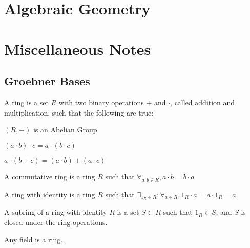 \documentclass[crop=false,class=article,oneside]{standalone}
\begin{document}
    \ifx\ifmathcoursesalgebraicgeometry\undefined
        \section*{Algebraic Geometry}
        \setcounter{section}{2}
        \renewcommand\thefigure{\arabic{section}.\arabic{figure}}
        \renewcommand\thesubfigure{%
            \arabic{section}.\arabic{figure}.\arabic{subfigure}}
    \else
        \section{Miscellaneous Notes}
    \fi
    \subsection{Groebner Bases}
        \begin{definition}
            A ring is a set $R$ with two binary operations $+$
            and $\cdot$, called addition and multiplication,
            such that the following are true:
            \begin{enumerate}
                \begin{multicols}{3}
                    \item $(R,+)$ is an Abelian Group
                    \item $(a\cdot{b})\cdot{c}=a\cdot(b\cdot{c})$
                    \item $a\cdot(b+c)=(a\cdot b)+(a\cdot c)$
                \end{multicols}
            \end{enumerate}
        \end{definition}
        \begin{definition}
            A commutative ring is a ring $R$ such that
            $\forall_{a,b\in R},a\cdot{b}=b\cdot{a}$
        \end{definition}
        \begin{definition}
            A ring with identity is a ring $R$ such that
            $\exists_{1_{R}\in R}:\forall_{a\in R}, 1_{R}\cdot a=a\cdot 1_{R}=a$
        \end{definition}
        \begin{definition}
            A subring of a ring with identity $R$ is a set
            $S\subset R$ such that $1_{R}\in S$, and $S$ is
            closed under the ring operations.
        \end{definition}
        \begin{remark}
            Any field is a ring.
        \end{remark}
\end{document}
